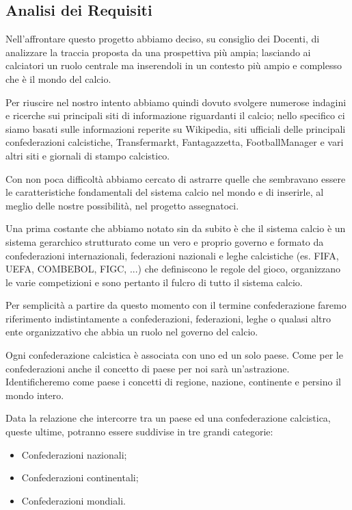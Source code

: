 \subsection{Analisi dei Requisiti}

Nell'affrontare questo progetto abbiamo deciso, su consiglio dei Docenti, di analizzare
la traccia proposta da una prospettiva più ampia; lasciando ai calciatori un ruolo centrale
ma inserendoli in un contesto più ampio e complesso che è il mondo del calcio.

Per riuscire nel nostro intento abbiamo quindi dovuto svolgere numerose indagini e ricerche
sui principali siti di informazione riguardanti il calcio; nello specifico ci siamo basati sulle
informazioni reperite su Wikipedia, siti ufficiali delle principali confederazioni calcistiche,
Transfermarkt, Fantagazzetta, FootballManager e vari altri siti e giornali di stampo calcistico.

Con non poca difficoltà abbiamo cercato di astrarre quelle che sembravano essere le
caratteristiche fondamentali del sistema calcio nel mondo e di inserirle, al meglio delle nostre
possibilità, nel progetto assegnatoci.

\bigskip
\bigskip

Una prima costante che abbiamo notato sin da subito è che il sistema calcio è un sistema
gerarchico strutturato come un vero e proprio governo e formato da confederazioni internazionali,
federazioni nazionali e leghe calcistiche (es. FIFA, UEFA, COMBEBOL, FIGC, ...) che definiscono
le regole del gioco, organizzano le varie competizioni e sono pertanto il fulcro di
tutto il sistema calcio.

Per semplicità a partire da questo momento con il termine confederazione faremo
riferimento indistintamente a confederazioni, federazioni, leghe o qualasi altro ente
organizzativo che abbia un ruolo nel governo del calcio.

Ogni confederazione calcistica è associata con uno ed un solo paese.\newline
Come per le confederazioni anche il concetto di paese per noi sarà un'astrazione.
Identificheremo come paese i concetti di regione, nazione, continente e persino il mondo intero.

Data la relazione che intercorre tra un paese ed una confederazione calcistica, queste ultime,
potranno essere suddivise in tre grandi categorie:
\begin{itemize}
	\item Confederazioni nazionali;
	\item Confederazioni continentali;
	\item Confederazioni mondiali.
\end{itemize}

